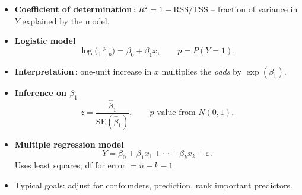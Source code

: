\documentclass[12pt]{book}
\begin{document}
\begin{itemize}
  \item \textbf{Coefficient of determination}\,: \(R^{2}=1-\text{RSS}/\text{TSS}\)
        – fraction of variance in \(Y\) explained by the model.

  \item \textbf{Logistic model}
        \[
          \log\!\bigl(\tfrac{p}{1-p}\bigr)
          =\beta_{0}+\beta_{1}x,
          \qquad
          p=P(Y=1).
        \]

  \item \textbf{Interpretation}\,: one-unit increase in \(x\)
        multiplies the \emph{odds} by \(\exp(\beta_{1})\).

  \item \textbf{Inference on \(\beta_{1}\)}
        \[
          z=\frac{\hat{\beta}_{1}}{\text{SE}(\hat{\beta}_{1})},
          \qquad
          p\text{-value from }N(0,1).
        \]

  \item \textbf{Multiple regression model}
        \[
          Y=\beta_{0}+\beta_{1}x_{1}+\cdots+\beta_{k}x_{k}+\varepsilon.
        \]
        Uses least squares; df for error \(=n-k-1\).

  \item Typical goals: adjust for confounders, prediction, rank important predictors.

\end{itemize}


\newpage
\pagestyle{fancy}
\end{document}
